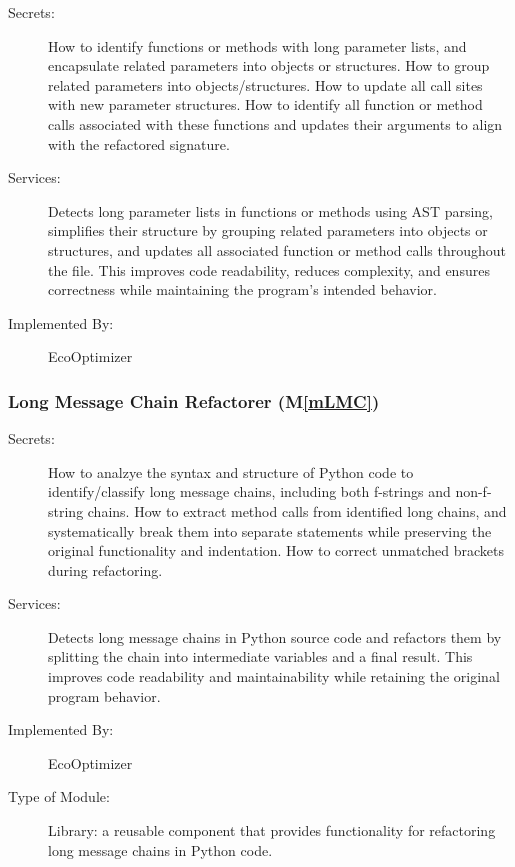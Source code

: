 \documentclass[12pt, titlepage]{article}
\newcommand{\mref}[1]{M\ref{#1}}
\begin{document}
\begin{description}
    \item[Secrets:] How to identify functions or methods with long parameter lists, and encapsulate related parameters into objects or structures. How to group related parameters into objects/structures. How to update all call sites with new parameter structures. How to identify all function or method calls associated with these functions and updates their arguments to align with the refactored signature.
    \item[Services:] Detects long parameter lists in functions or methods using AST parsing, simplifies their structure by grouping related parameters into objects or structures, and updates all associated function or method calls throughout the file. This improves code readability, reduces complexity, and ensures correctness while maintaining the program’s intended behavior.
    \item[Implemented By:] EcoOptimizer
\end{description}

\subsubsection{Long Message Chain Refactorer (\mref{mLMC})}


\begin{description}
    \item[Secrets:] How to analzye the syntax and structure of Python code to identify/classify long message chains, including both f-strings and non-f-string chains. How to extract method calls from identified long chains, and systematically break them into separate statements while preserving the original functionality and indentation. How to correct unmatched brackets during refactoring.
    \item[Services:] Detects long message chains in Python source code and refactors them by splitting the chain into intermediate variables and a final result. This improves code readability and maintainability while retaining the original program behavior. 

    \item[Implemented By:] EcoOptimizer
    \item[Type of Module:] Library: a reusable component that provides functionality for refactoring long message chains in Python code.
   
\end{description}
\end{document}
